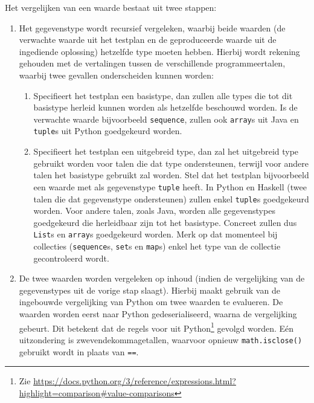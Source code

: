 Het vergelijken van een waarde bestaat uit twee stappen:
\begin{enumerate}
    \item Het gegevenstype wordt recursief vergeleken, waarbij beide waarden (de verwachte waarde uit het testplan en de geproduceerde waarde uit de ingediende oplossing) hetzelfde type moeten hebben.
    Hierbij wordt rekening gehouden met de vertalingen tussen de verschillende programmeertalen, waarbij twee gevallen onderscheiden kunnen worden:
    \begin{enumerate}
        \item Specifieert het testplan een basistype, dan zullen alle types die tot dit basistype herleid kunnen worden als hetzelfde beschouwd worden.
        Is de verwachte waarde bijvoorbeeld \texttt{sequence}, zullen ook \texttt{array}s uit Java en \texttt{tuple}s uit Python goedgekeurd worden.
        \item Specifieert het testplan een uitgebreid type, dan zal het uitgebreid type gebruikt worden voor talen die dat type ondersteunen, terwijl voor andere talen het basistype gebruikt zal worden.
        Stel dat het testplan bijvoorbeeld een waarde met als gegevenstype \texttt{tuple} heeft.
        In Python en Haskell (twee talen die dat gegevenstype ondersteunen) zullen enkel \texttt{tuple}s goedgekeurd worden.
        Voor andere talen, zoals Java, worden alle gegevenstypes goedgekeurd die herleidbaar zijn tot het basistype.
        Concreet zullen dus \texttt{List}s en \texttt{array}s goedgekeurd worden.
        Merk op dat momenteel bij collecties (\texttt{sequence}s, \texttt{set}s en \texttt{map}s) enkel het type van de collectie gecontroleerd wordt.
    \end{enumerate}
    \item De twee waarden worden vergeleken op inhoud (indien de vergelijking van de gegevenstypes uit de vorige stap slaagt).
    Hierbij maakt \tested{} gebruik van de ingebouwde vergelijking van Python om twee waarden te evalueren.
    De waarden worden eerst naar Python gedeserialiseerd, waarna de vergelijking gebeurt.
    Dit betekent dat de regels voor  uit Python\footnote{Zie \url{https://docs.python.org/3/reference/expressions.html?highlight=comparison\#value-comparisons}} gevolgd worden.
    Eén uitzondering is zwevendekommagetallen, waarvoor opnieuw \texttt{math.isclose()} gebruikt wordt in plaats van \texttt{==}.
\end{enumerate}

